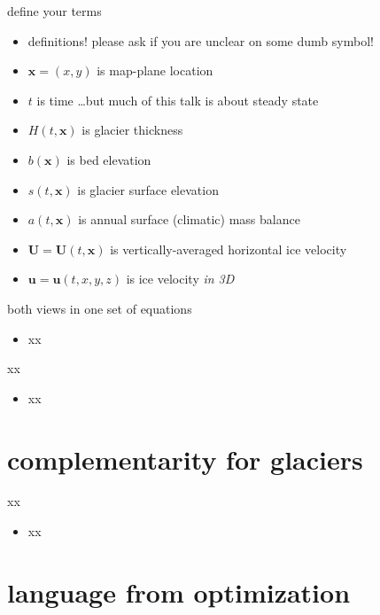 \documentclass[10pt,hyperref,dvipsnames]{beamer}
\newcommand{\bx}{\mathbf{x}}
\newcommand{\bu}{\mathbf{u}}
\newcommand{\bU}{\mathbf{U}}
\begin{document}
\begin{frame}{define your terms}
\begin{itemize}
\item definitions!  please ask if you are unclear on some dumb symbol!

\bigskip
\item $\bx = (x,y)$ is map-plane location
\item $t$ is time \dots but much of this talk is about steady state

\medskip
\item $H(t,\bx)$ is glacier thickness
\item $b(\bx)$ is bed elevation
\item $s(t,\bx)$ is glacier surface elevation
\item $a(t,\bx)$ is annual surface (climatic) mass balance
\item $\bU = \bU(t,\bx)$ is vertically-averaged horizontal ice velocity
\item $\bu = \bu(t,x,y,z)$ is ice velocity \emph{in 3D}
\end{itemize}
\end{frame}


\begin{frame}{both views in one set of equations}
\begin{itemize}
\item xx
\end{itemize}
\end{frame}


\begin{frame}{xx}
\begin{itemize}
\item xx
\end{itemize}
\end{frame}


\section{complementarity for glaciers}

\begin{frame}{xx}
\begin{itemize}
\item xx
\end{itemize}
\end{frame}


\section{language from optimization}
\end{document}
